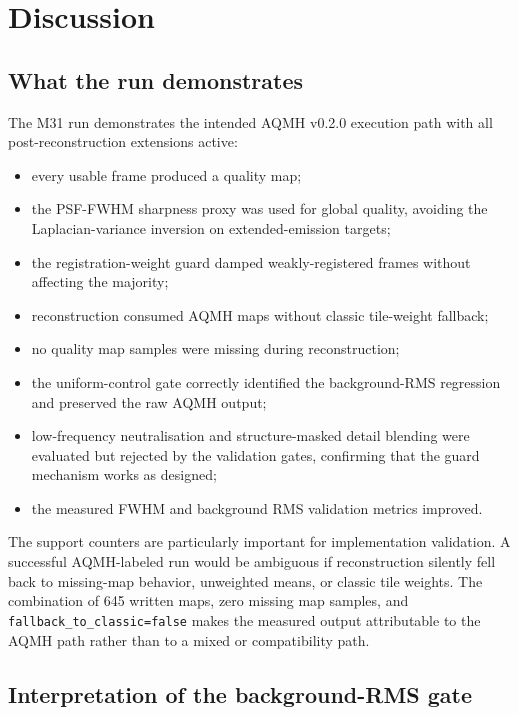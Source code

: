 \documentclass[10pt,twocolumn]{article}
\begin{document}
\section{Discussion}

\subsection{What the run demonstrates}

The M31 run demonstrates the intended AQMH v0.2.0 execution path with all post-reconstruction
extensions active:
\begin{itemize}
  \setlength{\itemsep}{0.05em}
  \setlength{\parsep}{0pt}
  \setlength{\parskip}{0pt}
  \setlength{\topsep}{0.15em}
  \item every usable frame produced a quality map;
  \item the PSF-FWHM sharpness proxy was used for global quality, avoiding the
        Laplacian-variance inversion on extended-emission targets;
  \item the registration-weight guard damped weakly-registered frames without affecting the
        majority;
  \item reconstruction consumed AQMH maps without classic tile-weight fallback;
  \item no quality map samples were missing during reconstruction;
  \item the uniform-control gate correctly identified the background-RMS regression and
        preserved the raw AQMH output;
  \item low-frequency neutralisation and structure-masked detail blending were evaluated but
        rejected by the validation gates, confirming that the guard mechanism works as designed;
  \item the measured FWHM and background RMS validation metrics improved.
\end{itemize}
The support counters are particularly important for implementation validation. A successful
AQMH-labeled run would be ambiguous if reconstruction silently fell back to missing-map behavior,
unweighted means, or classic tile weights. The combination of 645 written maps, zero missing map
samples, and \texttt{fallback\_to\_classic=false} makes the measured output attributable to the
AQMH path rather than to a mixed or compatibility path.

\subsection{Interpretation of the background-RMS gate}
\end{document}
